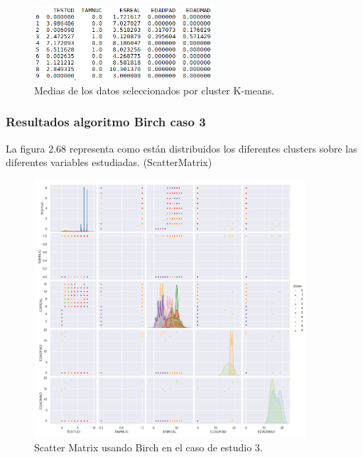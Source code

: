 	\begin{figure}[htb]
		\centering
		\includegraphics[width=0.6\textwidth]{./imagenes/caso3/medias_datos_caso3_K-means}
		\caption{Medias de los datos seleccionados por cluster K-means.} \label{fig:1}
	\end{figure}


	\subsubsection{Resultados algoritmo Birch caso 3}


	La figura 2.68 representa como están distribuidos los diferentes clusters sobre las diferentes variables estudiadas. (ScatterMatrix)\\

	\begin{figure}[htb]
		\centering
		\includegraphics[width=0.9\textwidth]{./imagenes/caso3/scatterMatrix_caso3_Birch}
		\caption{Scatter Matrix usando Birch en el caso de estudio 3.} \label{fig:1}
	\end{figure}

